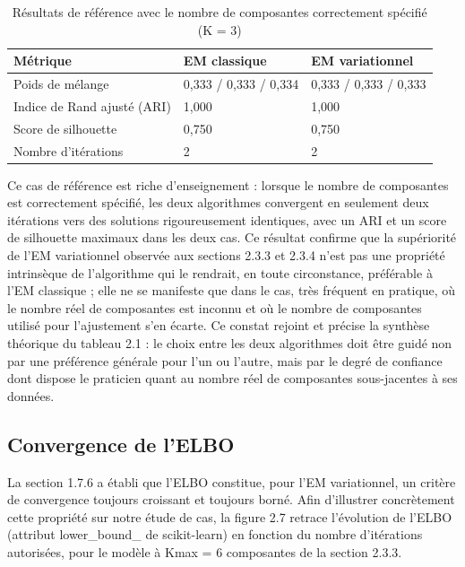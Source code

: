 \begin{table}[H]
\centering
\small
\setlength{\tabcolsep}{0.14cm}
\begin{tabular}{|p{4.84cm}|p{4.84cm}|p{4.84cm}|}
\hline
\textbf{Métrique} & \textbf{EM classique} & \textbf{EM variationnel} \\
\hline
Poids de mélange & 0,333 / 0,333 / 0,334 & 0,333 / 0,333 / 0,333 \\
\hline
Indice de Rand ajusté (ARI) & 1,000 & 1,000 \\
\hline
Score de silhouette & 0,750 & 0,750 \\
\hline
Nombre d'itérations & 2 & 2 \\
\hline
\end{tabular}
\caption{Résultats de référence avec le nombre de composantes correctement spécifié (K = 3)}
\label{tab:2_10}
\end{table}
Ce cas de référence est riche d'enseignement : lorsque le nombre de composantes est correctement spécifié, les deux algorithmes convergent en seulement deux itérations vers des solutions rigoureusement identiques, avec un ARI et un score de silhouette maximaux dans les deux cas. Ce résultat confirme que la supériorité de l'EM variationnel observée aux sections 2.3.3 et 2.3.4 n'est pas une propriété intrinsèque de l'algorithme qui le rendrait, en toute circonstance, préférable à l'EM classique ; elle ne se manifeste que dans le cas, très fréquent en pratique, où le nombre réel de composantes est inconnu et où le nombre de composantes utilisé pour l'ajustement s'en écarte. Ce constat rejoint et précise la synthèse théorique du tableau 2.1 : le choix entre les deux algorithmes doit être guidé non par une préférence générale pour l'un ou l'autre, mais par le degré de confiance dont dispose le praticien quant au nombre réel de composantes sous-jacentes à ses données.

\subsection{Convergence de l'ELBO}
La section 1.7.6 a établi que l'ELBO constitue, pour l'EM variationnel, un critère de convergence toujours croissant et toujours borné. Afin d'illustrer concrètement cette propriété sur notre étude de cas, la figure 2.7 retrace l'évolution de l'ELBO (attribut lower\_bound\_ de scikit-learn) en fonction du nombre d'itérations autorisées, pour le modèle à Kmax = 6 composantes de la section 2.3.3.

